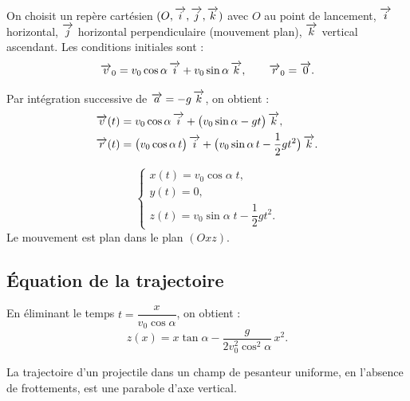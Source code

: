 On choisit un repère cartésien $(O,\overrightarrow{i},\overrightarrow{j},\overrightarrow{k})$ avec $O$ au point de lancement, $\overrightarrow{i}$ horizontal, $\overrightarrow{j}$ horizontal perpendiculaire (mouvement plan), $\overrightarrow{k}$ vertical ascendant. Les conditions initiales sont :
\[
\overrightarrow{v}_0 = v_0\cos\alpha\,\overrightarrow{i} + v_0\sin\alpha\,\overrightarrow{k}, \qquad \overrightarrow{r}_0 = \overrightarrow{0}.
\]

Par intégration successive de $\overrightarrow{a} = -g\,\overrightarrow{k}$, on obtient :
\begin{align*}
\overrightarrow{v}(t) &= v_0\cos\alpha\,\overrightarrow{i} + \bigl(v_0\sin\alpha - gt\bigr)\,\overrightarrow{k},\\
\overrightarrow{r}(t) &= \bigl(v_0\cos\alpha\,t\bigr)\,\overrightarrow{i} + \bigl(v_0\sin\alpha\,t - \frac12 g t^2\bigr)\,\overrightarrow{k}.
\end{align*}

\begin{propriete}
\[
\begin{cases}
x(t) = v_0\cos\alpha\; t,\\[2pt]
y(t) = 0,\\[2pt]
z(t) = v_0\sin\alpha\; t - \dfrac12 g t^2.
\end{cases}
\]
Le mouvement est plan dans le plan $(Oxz)$.
\end{propriete}

\subsection{Équation de la trajectoire}

En éliminant le temps $t = \dfrac{x}{v_0\cos\alpha}$, on obtient :
\[
z(x) = x\tan\alpha - \frac{g}{2v_0^2\cos^2\alpha}\,x^2.
\]

\begin{loi}
La trajectoire d’un projectile dans un champ de pesanteur uniforme, en l’absence de frottements, est une parabole d’axe vertical.
\end{loi}

\begin{illus}
\end{illus}

